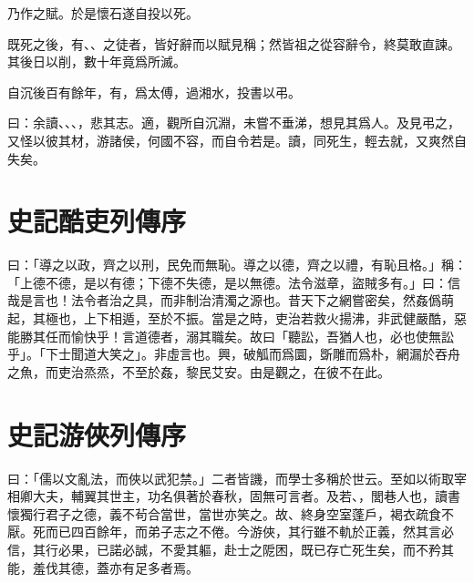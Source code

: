 乃作之賦。於是懷石遂自投以死。

既死之後，有、、之徒者，皆好辭而以賦見稱；然皆祖之從容辭令，終莫敢直諫。其後日以削，數十年竟爲所滅。

自沉後百有餘年，有，爲太傅，過湘水，投書以弔。

曰：余讀、、、，悲其志。適，觀所自沉淵，未嘗不垂涕，想見其爲人。及見弔之，又怪以彼其材，游諸侯，何國不容，而自令若是。讀，同死生，輕去就，又爽然自失矣。

\theendnotes

\section[酷吏列傳序\quad{\small 史記}]{{\normalsize 史記}\quad 酷吏列傳序}
曰：「導之以政，齊之以刑，民免而無恥。導之以德，齊之以禮，有恥且格。」稱：「上德不德，是以有德；下德不失德，是以無德。法令滋章，盜賊多有。」曰：信哉是言也！法令者治之具，而非制治清濁之源也。昔天下之網嘗密矣，然姦僞萌起，其極也，上下相遁，至於不振。當是之時，吏治若救火揚沸，非武健嚴酷，惡能勝其任而愉快乎！言道德者，溺其職矣。故曰「聽訟，吾猶人也，必也使無訟乎」。「下士聞道大笑之」。非虛言也。興，破觚而爲圜，斲雕而爲朴，網漏於吞舟之魚，而吏治烝烝，不至於姦，黎民艾安。由是觀之，在彼不在此。

\theendnotes

\section[游俠列傳序\quad{\small 史記}]{{\normalsize 史記}\quad 游俠列傳序}
曰：「儒以文亂法，而俠以武犯禁。」二者皆譏，而學士多稱於世云。至如以術取宰相卿大夫，輔翼其世主，功名俱著於春秋，固無可言者。及若、，閭巷人也，讀書懷獨行君子之德，義不茍合當世，當世亦笑之。故、終身空室蓬戶，褐衣疏食不厭。死而已四百餘年，而弟子志之不倦。今游俠，其行雖不軌於正義，然其言必信，其行必果，已諾必誠，不愛其軀，赴士之阸困，既已存亡死生矣，而不矜其能，羞伐其德，蓋亦有足多者焉。


